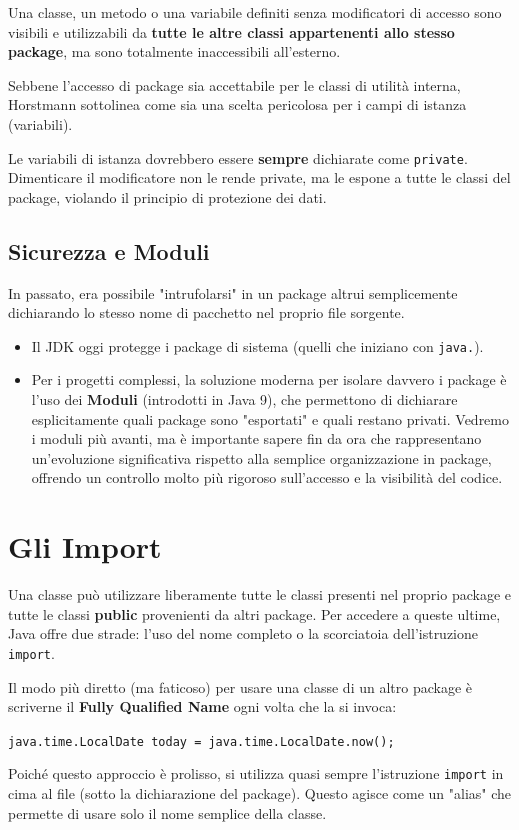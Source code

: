 Una classe, un metodo o una variabile definiti senza modificatori di accesso sono visibili e utilizzabili da \textbf{tutte le altre classi appartenenti allo stesso package}, ma sono totalmente inaccessibili all'esterno.

Sebbene l'accesso di package sia accettabile per le classi di utilità interna, Horstmann sottolinea come sia una scelta pericolosa per i campi di istanza (variabili).

\begin{important}
    Le variabili di istanza dovrebbero essere \textbf{sempre} dichiarate come \texttt{private}. Dimenticare il modificatore non le rende private, ma le espone a tutte le classi del package, violando il principio di protezione dei dati.
\end{important}

\subsection{Sicurezza e Moduli}
In passato, era possibile "intrufolarsi" in un package altrui semplicemente dichiarando lo stesso nome di pacchetto nel proprio file sorgente. 
\begin{itemize}
    \item Il JDK oggi protegge i package di sistema (quelli che iniziano con \texttt{java.}).
    \item Per i progetti complessi, la soluzione moderna per isolare davvero i package è l'uso dei \textbf{Moduli} (introdotti in Java 9), che permettono di dichiarare esplicitamente quali package sono "esportati" e quali restano privati. Vedremo i moduli più avanti, ma è importante sapere fin da ora che rappresentano un'evoluzione significativa rispetto alla semplice organizzazione in package, offrendo un controllo molto più rigoroso sull'accesso e la visibilità del codice.
\end{itemize}

\section{Gli Import}

Una classe può utilizzare liberamente tutte le classi presenti nel proprio package e tutte le classi \textbf{public} provenienti da altri package. Per accedere a queste ultime, Java offre due strade: l'uso del nome completo o la scorciatoia dell'istruzione \texttt{import}.

Il modo più diretto (ma faticoso) per usare una classe di un altro package è scriverne il \textbf{Fully Qualified Name} ogni volta che la si invoca:
\begin{center}
    \texttt{java.time.LocalDate today = java.time.LocalDate.now();}
\end{center}
Poiché questo approccio è prolisso, si utilizza quasi sempre l'istruzione \texttt{import} in cima al file (sotto la dichiarazione del package). Questo agisce come un "alias" che permette di usare solo il nome semplice della classe.

